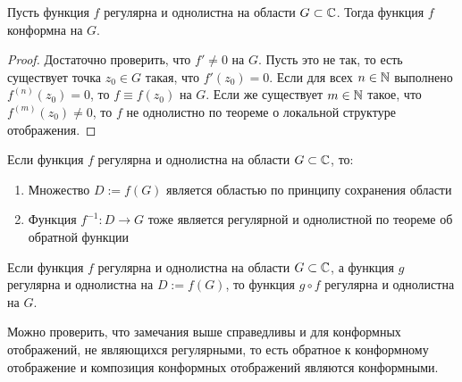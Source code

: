 \begin{proposition}
	Пусть функция $f$ регулярна и однолистна на области $G \subset \mathbb{C}$. Тогда функция $f$ конформна на $G$.
\end{proposition}

\begin{proof}
	Достаточно проверить, что $f' \ne 0$ на $G$. Пусть это не так, то есть существует точка $z_0 \in G$ такая, что $f'(z_0) = 0$. Если для всех $n \in \mathbb{N}$ выполнено $f^{(n)}(z_0) = 0$, то $f \equiv f(z_0)$ на $G$. Если же существует $m \in \mathbb{N}$ такое, что $f^{(m)}(z_0) \ne 0$, то $f$ не однолистно по теореме о локальной структуре отображения.
\end{proof}

\begin{note}
	Если функция $f$ регулярна и однолистна на области $G \subset \mathbb{C}$, то:
	\begin{enumerate}
		\item Множество $D := f(G)$ является областью по принципу сохранения области
		\item Функция $f^{-1} : D \to G$ тоже является регулярной и однолистной по теореме об обратной функции
	\end{enumerate}
\end{note}

\pagebreak
\begin{note}
	Если функция $f$ регулярна и однолистна на области $G \subset \mathbb{C}$, а функция $g$ регулярна и однолистна на $D := f(G)$, то функция $g \circ f$ регулярна и однолистна на $G$.
\end{note}

\begin{note}
	Можно проверить, что замечания выше справедливы и для конформных отображений, не являющихся регулярными, то есть обратное к конформному отображение и композиция конформных отображений являются конформными.
\end{note}

